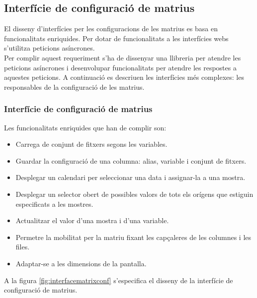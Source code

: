 \subsection{Interf\'{i}cie de configuraci\'{o} de matrius}
El disseny d'interfícies per les configuracions de les matrius es basa en funcionalitats enriquides\cite{ria}. Per dotar de funcionalitats a les interfícies webs s'utilitza peticions asíncrones.\\ 

Per complir aquest requeriment s'ha de dissenyar una llibreria per atendre les peticions asíncrones i desenvolupar funcionalitats per atendre les respostes a aquestes peticions. A continuaci\'{o} es descriuen les interf\'{i}cies m\'{e}s complexes: les responsables de la configuraci\'{o} de les matrius.

\subsubsection{Interf\'{i}cie de configuraci\'{o} de matrius}
Les funcionalitats enriquides que han de complir son:
\begin{itemize}
\item Carrega de conjunt de fitxers segons les variables.
\item Guardar la configuració de una columna: alias, variable i conjunt de fitxers.
\item Desplegar un calendari per seleccionar una data i assignar-la a una mostra.
\item Desplegar un selector obert de possibles valors de tots els orígens que estiguin especificats a les mostres.
\item Actualitzar el valor d'una mostra i d'una variable.
\item Permetre la mobilitat per la matriu fixant les capçaleres de les columnes i les files.
\item Adaptar-se a les dimensions de la pantalla.
\end{itemize}

A la figura \ref{fig:interfacematrixconf} s'especifica el disseny de la interfície de configuraci\'{o} de matrius.

